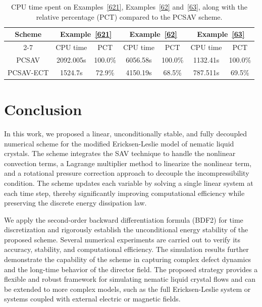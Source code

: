 \documentclass[12pt,reqno]{amsart}
\numberwithin{equation}{section}
\begin{document}
\begin{table}[tp]
\centering
\caption{\noindent CPU time spent on Examples~\ref{621}, Examples~\ref{62} and~\ref{63}, along with the relative percentage (PCT) compared to the PCSAV scheme.}
\label{tab:cputime}
\begin{tabular}{|c||c|c||c|c||c|c|}
\hline
\multirow{2}{*}{Scheme} 
& \multicolumn{2}{c||}{Example~\ref{621}}
& \multicolumn{2}{c||}{Example~\ref{62}} 
& \multicolumn{2}{c|}{Example~\ref{63}} \\
\cline{2-7}
& CPU time & PCT& CPU time & PCT & CPU time & PCT \\
\hline
PCSAV & 2092.005s & 100.0\% & 6056.58s & 100.0\% & 1132.41s & 100.0\% \\
PCSAV-ECT & 1524.7s & 72.9\% & 4150.19s & 68.5\% & 787.511s & 69.5\% \\
\hline
\end{tabular}
\end{table}

\section*{Conclusion}
In this work, we proposed a linear, unconditionally stable, and fully decoupled numerical scheme for the modified Ericksen-Leslie model of nematic liquid crystals. 
The scheme integrates the SAV technique to handle the nonlinear convection terms, a Lagrange multiplier method to linearize the nonlinear term, and a rotational pressure correction approach to decouple the incompressibility condition. 
The scheme updates each variable by solving a single linear system at each time step, thereby significantly improving computational efficiency while preserving the discrete energy dissipation law.

We apply the second-order backward differentiation formula (BDF2) for time discretization and rigorously establish the unconditional energy stability of the proposed scheme. 
Several numerical experiments are carried out to verify its accuracy, stability, and computational efficiency. 
The simulation results further demonstrate the capability of the scheme in capturing complex defect dynamics and the long-time behavior of the director field.
The proposed strategy provides a flexible and robust framework for simulating nematic liquid crystal flows and can be extended to more complex models, such as the full Ericksen-Leslie system or systems coupled with external electric or magnetic fields.
\end{document}
